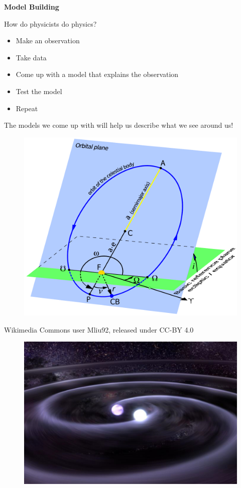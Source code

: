 \documentclass[]{article}
\begin{document}
\begin{PresentSpace}
\begin{center}
	\textbf{Model Building}
\end{center}
How do physicists do physics?
\begin{itemize}
	\item Make an observation
	\item Take data
	\item Come up with a model that explains the observation
	\item Test the model
	\item Repeat
\end{itemize}
The models we come up with will help us describe what we see around us!
\begin{figure}[h]
	\centering
	\includegraphics[scale=0.4]{BahnelementeEllipse_eng.pdf}
\end{figure}

\begin{center}
	\small Wikimedia Commons user Mliu92, released under CC-BY 4.0
\end{center}

\begin{figure}[h]
	\centering
	\includegraphics[scale=0.4]{J0806.jpeg}
\end{figure}


\end{PresentSpace}
\end{document}

